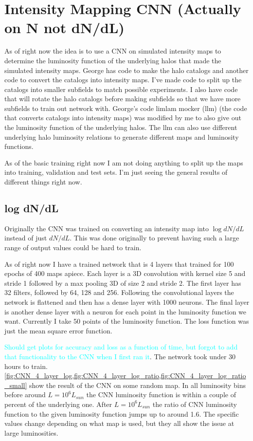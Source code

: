 \documentclass{article}
\newcommand{\dnp}[1]{\textcolor{cyan}{#1}}
\begin{document}
	\section{Intensity Mapping CNN (Actually on N not dN/dL)} \label{sec:cnn}

		As of right now the idea is to use a CNN on simulated intensity maps to determine the luminosity function of the underlying halos that made the simulated intensity maps.  George has code to make the halo catalogs and another code to convert the catalogs into intensity maps.  I've made code to split up the catalogs into smaller subfields to match possible experiments.  I also have code that will rotate the halo catalogs before making subfields so that we have more subfields to train out network with.  George's code limlam mocker (llm) (the code that converts catalogs into intensity maps) was modified by me to also give out the luminosity function of the underlying halos.  The llm can also use different underlying halo luminosity relations to generate different maps and luminosity functions.

		As of the basic training right now I am not doing anything to split up the maps into training, validation and test sets.  I'm just seeing the general results of different things right now.

		\subsection{log dN/dL} \label{sec:logValue}
			Originally the CNN was trained on converting an intensity map into \(\log dN/dL\) instead of just \(dN/dL\).  This was done originally to prevent having such a large range of output values could be hard to train.

			As of right now I have a trained network that is 4 layers that trained for 100 epochs of 400 maps apiece.  Each layer is a 3D convolution with kernel size 5 and stride 1 followed by a max pooling 3D of size 2 and stride 2.  The first layer has 32 filters, followed by 64, 128 and 256.  Following the convolutional layers the network is flattened and then has a dense layer with 1000 neurons.  The final layer is another dense layer with a neuron for each point in the luminosity function we want.  Currently I take 50 points of the luminosity function.  The loss function was just the mean square error function.

			\dnp{Should get plots for accuracy and loss as a function of time, but forgot to add that functionality to the CNN when I first ran it}.  The network took under 30 hours to train.  \cref{fig:CNN_4_layer_log,fig:CNN_4_layer_log_ratio,fig:CNN_4_layer_log_ratio_small} show the result of the CNN on some random map.  In all luminosity bins before around \(L = 10^6 L_{sun}\) the CNN luminosity function is within a couple of percent of the underlying one.  After \(L = 10^6 L_{sun}\) the ratio of CNN luminosity function to the given luminosity function jumps up to around 1.6.  The specific values change depending on what map is used, but they all show the issue at large luminosities.
\end{document}
